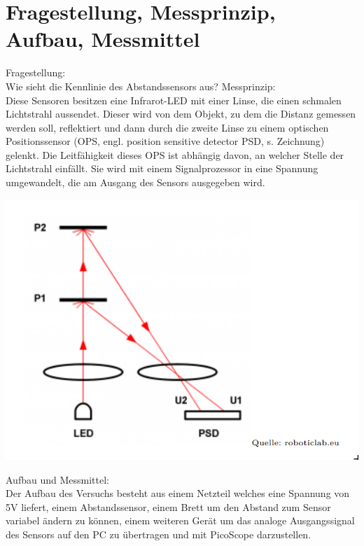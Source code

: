 \documentclass[12pt, oneside, a4paper, \docLanguage]{report}
\begin{document}
\section{Fragestellung, Messprinzip, Aufbau, Messmittel}
\label{chap:VERSUCH_1_FRAGESTELLUNG}
\begin{normalsize}
Fragestellung:\\
Wie sieht die Kennlinie des Abstandssensors aus?
\newline
\newline
Messprinzip:\\
Diese Sensoren besitzen eine Infrarot-LED mit einer Linse, die einen schmalen
Lichtstrahl aussendet. Dieser wird von dem Objekt, zu dem die Distanz gemessen werden
soll, reflektiert und dann durch die zweite Linse zu einem optischen Positionssensor (OPS,
engl. position sensitive detector PSD, s. Zeichnung) gelenkt. Die Leitfähigkeit dieses OPS ist
abhängig davon, an welcher Stelle der Lichtstrahl einfällt. Sie wird mit einem Signalprozessor
in eine Spannung umgewandelt, die am Ausgang des Sensors ausgegeben wird.\\
\begin{minipage}{\linewidth}
\begin{center}
\includegraphics[scale=0.38]{Sensor.png}
\end{center}
\end{minipage}
Aufbau und Messmittel:\\
Der Aufbau des Versuchs besteht aus einem Netzteil welches eine Spannung von 5V liefert, einem Abstandssensor, einem Brett um den Abstand zum Sensor variabel ändern zu können, einem weiteren Gerät um das analoge Ausgangssignal des Sensors auf den PC zu übertragen und mit PicoScope darzustellen.\newline

\end{normalsize}
\end{document}
